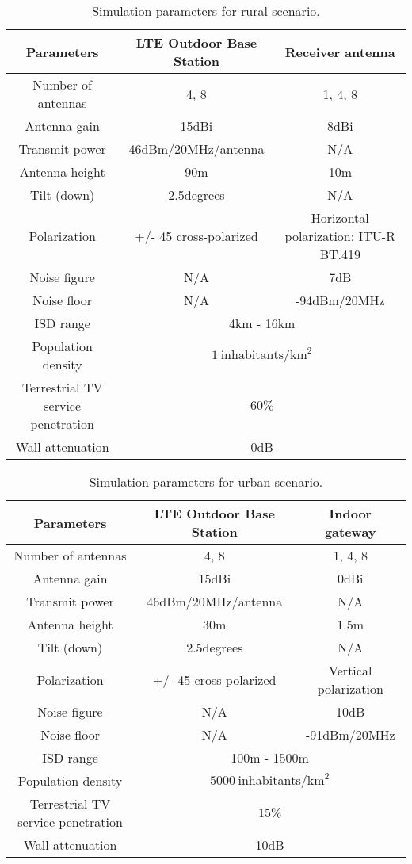 \documentclass[journal]{IEEEtran}
\begin{document}
\begin{table*}
\caption{Simulation parameters for rural scenario.}\label{table:rural}
\centering
\begin{tabular}{|c|c|c|}
  \hline
Parameters&	LTE Outdoor Base Station&	Receiver antenna \\
\hline
Number of antennas	&4, 8	&1, 4, 8\\
Antenna gain	&15dBi	&8dBi \\
Transmit power	&46dBm/20MHz/antenna &N/A	\\
Antenna height	&90m	&10m\\
Tilt (down)	&2.5degrees&N/A \\
Polarization	&+/- 45 cross-polarized	&Horizontal polarization: ITU-R BT.419 \cite{BT419}\\
Noise figure	&N/A	&7dB\\
Noise floor	&N/A &-94dBm/20MHz	\\
\hline
ISD range	&\multicolumn{2}{c|}{4km - 16km} \\
Population density 	&\multicolumn{2}{c|}{$1 \mathrm{~inhabitants} /\text{km}^2$} \\
Terrestrial TV service penetration	&\multicolumn{2}{c|}{$60\%$} \\
Wall attenuation  &\multicolumn{2}{c|}{0dB} \\
  \hline
\end{tabular}
\end{table*}

\begin{table*}
\caption{Simulation parameters for urban scenario.}\label{table:urban}
\centering
\begin{tabular}{|c|c|c|}
  \hline
Parameters&	LTE Outdoor Base Station&	Indoor gateway \\
\hline
Number of antennas	&4, 8	&1, 4, 8\\
Antenna gain	&15dBi	&0dBi \\
Transmit power	&46dBm/20MHz/antenna &N/A	\\
Antenna height	&30m	&1.5m\\
Tilt (down)	&2.5degrees&N/A \\
Polarization	&+/- 45 cross-polarized	&Vertical polarization\\
Noise figure	&N/A	&10dB\\
Noise floor	&N/A &-91dBm/20MHz	\\
\hline
ISD range	&\multicolumn{2}{c|}{100m - 1500m} \\
Population density 	&\multicolumn{2}{c|}{$5000 \mathrm{~inhabitants}/\text{km}^2$} \\
Terrestrial TV service penetration	&\multicolumn{2}{c|}{$15\%$} \\
Wall attenuation  &\multicolumn{2}{c|}{10dB} \\
  \hline
\end{tabular}
\end{table*}
\end{document}

